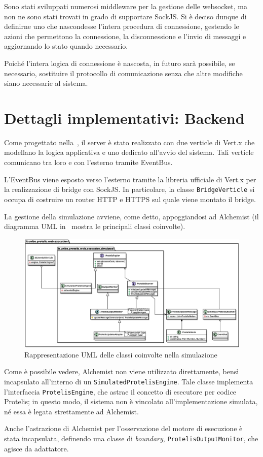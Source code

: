     Sono stati sviluppati numerosi middleware per la gestione delle websocket, ma non ne sono stati trovati in grado di supportare SockJS\@.
    Si è deciso dunque di definirne uno che nascondesse l'intera procedura di connessione, gestendo le azioni che permettono la connessione, la disconnessione e l'invio di messaggi e aggiornando lo stato quando necessario.

    Poiché l'intera logica di connessione è nascosta, in futuro sarà possibile, se necessario, sostituire il protocollo di comunicazione senza che altre modifiche siano necessarie al sistema.

  \section{Dettagli implementativi: Backend}

    Come progettato nella~, il server è stato realizzato con due verticle di Vert.x che modellano la logica applicativa e uno dedicato all'avvio del sistema.
    Tali verticle comunicano tra loro e con l'esterno tramite EventBus.

    L'EventBus viene esposto verso l'esterno tramite la libreria ufficiale di Vert.x per la realizzazione di bridge con SockJS\@.
    In particolare, la classe \texttt{BridgeVerticle} si occupa di costruire un router HTTP e HTTPS sul quale viene montato il bridge.

    La gestione della simulazione avviene, come detto, appoggiandosi ad Alchemist (il diagramma UML in~ mostra le principali classi coinvolte).

    \begin{figure}[htbp]
      \centering
      \includegraphics[width=\textwidth]{res/uml/engine-simple.eps}
      \caption{Rappresentazione UML delle classi coinvolte nella simulazione}%
      \label{fig:server:uml}
    \end{figure}

    Come è possibile vedere, Alchemist non viene utilizzato direttamente, bensì incapsulato all'interno di un \texttt{SimulatedProtelisEngine}.
    Tale classe implementa l'interfaccia \texttt{ProtelisEngine}, che astrae il concetto di esecutore per codice Protelis;
    in questo modo, il sistema non è vincolato all'implementazione simulata, né essa è legata strettamente ad Alchemist.

    Anche l'astrazione di Alchemist per l'osservazione del motore di esecuzione è stata incapsulata, definendo una classe di \emph{boundary}, \texttt{ProtelisOutputMonitor}, che agisce da adattatore.
